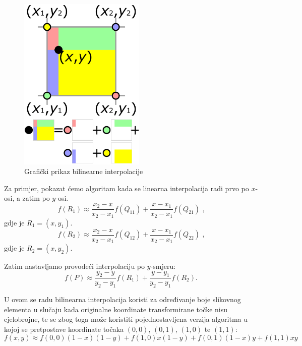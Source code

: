 \begin{figure}[ht]
\centering
\includegraphics[width=6cm]{figures/bilint_visualization.png}
\caption{Grafički prikaz bilinearne interpolacije}
\label{fig:bilintPrikaz}
\end{figure}

Za primjer, pokazat ćemo algoritam kada se linearna interpolacija radi prvo po $x$-osi, a zatim po $y$-osi.
\begin{equation}
f(R_1) \approx \frac{x_2 - x}{x_2 - x_1} f(Q_{11}) + \frac{x - x_1}{x_2 - x_1} f(Q_{21})\text{ ,}
\end{equation}
gdje je  $R_1 = (x, y_1)$.
\begin{equation}
f(R_2) \approx \frac{x_2 - x}{x_2 - x_1} f(Q_{12}) + \frac{x - x_1}{x_2 - x_1} f(Q_{22})\text{ ,}
\end{equation}
gdje je  $R_2 = (x, y_2)$.

Zatim nastavljamo provodeći interpolaciju po $y$-smjeru:
\begin{equation}
f(P) \approx \frac{y_2 - y}{y_2 - y_1} f(R_1) + \frac{y - y_1}{y_2 - y_1} f(R_2).
\end{equation}

U ovom se radu bilinearna interpolacija koristi za određivanje boje slikovnog elementa  u slučaju kada originalne koordinate transformirane točke nisu cjelobrojne, te se zbog toga može koristiti pojednostavljena verzija algoritma u kojoj se pretpostave koordinate točaka $(0,0)$, $(0, 1)$, $(1, 0)$ te $(1, 1)$:
\begin{equation}
\label{eq:interpolationSImple}
f(x, y) \approx f(0, 0)(1 - x)(1 -  y) + f(1, 0) x (1 - y) + f(0, 1) (1 - x) y + f(1, 1) x y
\end{equation}

